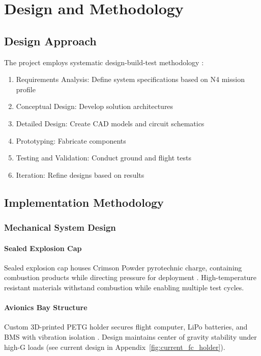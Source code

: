 \section{Design and Methodology}
\label{sec:methodology}

\subsection{Design Approach}

The project employs systematic design-build-test methodology \cite{student_rocket_design}:

\begin{enumerate}
    \item Requirements Analysis: Define system specifications based on N4 mission profile
    \item Conceptual Design: Develop solution architectures
    \item Detailed Design: Create CAD models and circuit schematics
    \item Prototyping: Fabricate components
    \item Testing and Validation: Conduct ground and flight tests
    \item Iteration: Refine designs based on results
\end{enumerate}

\subsection{Implementation Methodology}

\subsubsection{Mechanical System Design}

\paragraph{Sealed Explosion Cap}
Sealed explosion cap houses Crimson Powder pyrotechnic charge, containing combustion products while directing pressure for deployment \cite{nakka_crimson}. High-temperature resistant materials withstand combustion while enabling multiple test cycles.

\paragraph{Avionics Bay Structure}
Custom 3D-printed PETG holder secures flight computer, LiPo batteries, and BMS with vibration isolation \cite{avionics_vibration}. Design maintains center of gravity stability under high-G loads (see current design in Appendix~\ref{fig:current_fc_holder}).

